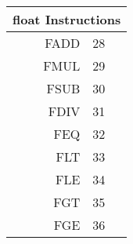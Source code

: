 \begin{tabular}{|r|l|}\hline
\multicolumn{2}{|c|}{float Instructions}\\ \hline
FADD & 28 \\ \hline
FMUL & 29 \\ \hline
FSUB & 30 \\ \hline
FDIV & 31 \\ \hline
FEQ & 32 \\ \hline
FLT & 33 \\ \hline
FLE & 34 \\ \hline
FGT & 35 \\ \hline
FGE & 36 \\ \hline
\end{tabular}
